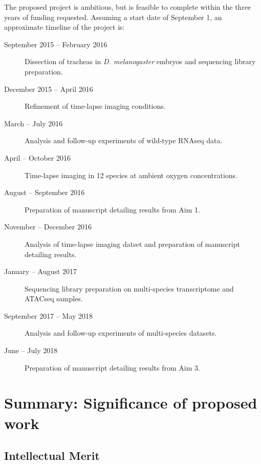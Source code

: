 \documentclass{proposal}
\begin{document}
The proposed project is ambitious, but is feasible to complete within the three years of funding requested.  Assuming a start date of September 1, an approximate timeline of the project is:

\begin{description}
\item[September 2015 -- February 2016] Dissection of tracheas in {\em D. melanogaster} embryos and sequencing library preparation.

\item[December 2015 -- April 2016] Refinement of time-lapse imaging conditions.

\item[March  -- July 2016] Analysis and follow-up experiments of wild-type RNAseq data.

\item[April -- October 2016] Time-lapse imaging in 12 species at ambient oxygen concentrations.

\item[August -- September 2016] Preparation of manuscript detailing results from Aim 1.

\item[November -- December 2016] Analysis of time-lapse imaging datset and preparation of manuscript detailing results.

\item[January -- August 2017] Sequencing library preparation on multi-species transcriptome and ATACseq samples.

\item[September 2017 -- May 2018] Analysis and follow-up experiments of multi-species datasets.

\item[June -- July 2018]  Preparation of manuscript detailing results from Aim 3.

\end{description}



\section{Summary:  Significance of proposed work}

\subsection{Intellectual Merit}
\end{document}
